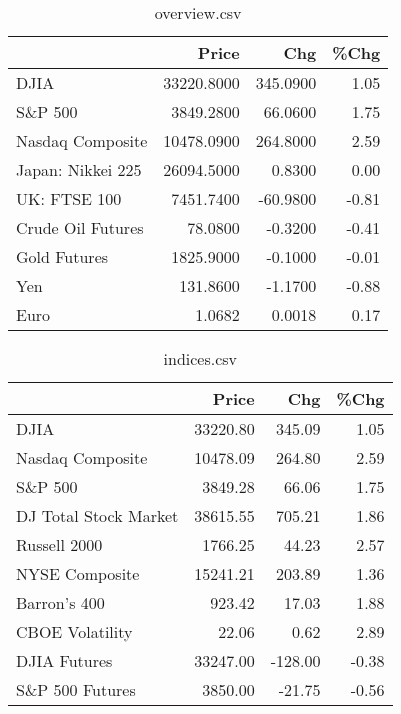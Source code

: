 \documentclass{article}%
\begin{document}
\begin{table}[htbp]%
\caption{overview.csv}%
\centering%
\begin{adjustbox}{width=1\textwidth}%
\begin{tabular}{lrrr}
\toprule
                  &      Price &      Chg &  \%Chg \\
\midrule
             DJIA & 33220.8000 & 345.0900 &  1.05 \\
          S\&P 500 &  3849.2800 &  66.0600 &  1.75 \\
 Nasdaq Composite & 10478.0900 & 264.8000 &  2.59 \\
Japan: Nikkei 225 & 26094.5000 &   0.8300 &  0.00 \\
     UK: FTSE 100 &  7451.7400 & -60.9800 & -0.81 \\
Crude Oil Futures &    78.0800 &  -0.3200 & -0.41 \\
     Gold Futures &  1825.9000 &  -0.1000 & -0.01 \\
              Yen &   131.8600 &  -1.1700 & -0.88 \\
             Euro &     1.0682 &   0.0018 &  0.17 \\
\bottomrule
\end{tabular}
%
\end{adjustbox}%
\end{table}

%


\begin{table}[htbp]%
\caption{indices.csv}%
\centering%
\begin{adjustbox}{width=1\textwidth}%
\begin{tabular}{lrrr}
\toprule
                      &    Price &     Chg &  \%Chg \\
\midrule
                 DJIA & 33220.80 &  345.09 &  1.05 \\
     Nasdaq Composite & 10478.09 &  264.80 &  2.59 \\
              S\&P 500 &  3849.28 &   66.06 &  1.75 \\
DJ Total Stock Market & 38615.55 &  705.21 &  1.86 \\
         Russell 2000 &  1766.25 &   44.23 &  2.57 \\
       NYSE Composite & 15241.21 &  203.89 &  1.36 \\
         Barron's 400 &   923.42 &   17.03 &  1.88 \\
      CBOE Volatility &    22.06 &    0.62 &  2.89 \\
         DJIA Futures & 33247.00 & -128.00 & -0.38 \\
      S\&P 500 Futures &  3850.00 &  -21.75 & -0.56 \\
\bottomrule
\end{tabular}
%
\end{adjustbox}%
\end{table}
\end{document}
